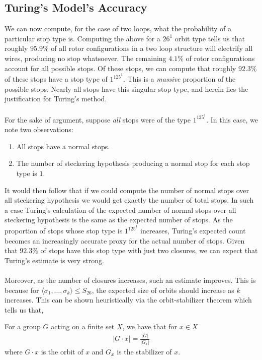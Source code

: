 \subsection{Turing's Model's Accuracy}\label{justify_turing}
We can now compute, for the case of two loops, what the probability of
a particular stop type is. Computing the above for a $26^1$ orbit
type tells us that roughly $95.9\%$ of all rotor configurations
in a two loop structure will electrify all wires, producing no stop
whatsoever. The remaining $4.1\%$ of rotor configurations account for
all possible stops. Of these stops, we can compute that roughly
$92.3\%$ of these stops have a stop type of $1^125^1$. This is a
\emph{massive} proportion of the possible stops. Nearly all stops
have this singular stop type, and herein lies the justification for
Turing's method.
\\\\For the sake of argument, suppose \emph{all} stops were of the
type $1^125^1$. In this case, we note two observations:
\begin{enumerate}[(1)]
  \item All stops have a normal stops.
  \item The number of steckering hypothesis producing a normal stop
    for each stop type is $1$.
\end{enumerate}
It would then follow that if we could compute the number of normal
stops over all steckering hypothesis we would get exactly the number
of total stops. In such a case Turing's calculation of the expected
number of normal stops over all steckering hypothesis is the same as
the expected number of stops. As the proportion of stops whose stop
type is $1^125^1$ increases, Turing’s expected count becomes an
increasingly accurate proxy for the actual number of stops. Given
that $92.3\%$ of stops have this stop
type with just two closures, we can expect that Turing's estimate is
very strong.
\\\\Moreover, as the number of closures increases, such an estimate improves.
This is because for $\langle \sigma_1, \dots, \sigma_k\rangle\le
S_{26}$, the expected size of orbits should increase as $k$
increases. This can be shown heuristically via the orbit-stabilizer
theorem which tells us that,
\begin{theorem}
  For a group $G$ acting on a finite set $X$, we have that for $x\in X$
  \begin{align*}
    |G\cdot x| = \frac{|G|}{|G_x|}
  \end{align*}
  where $G\cdot x$ is the orbit of $x$ and $G_x$ is the stabilizer of $x$.
\end{theorem}
